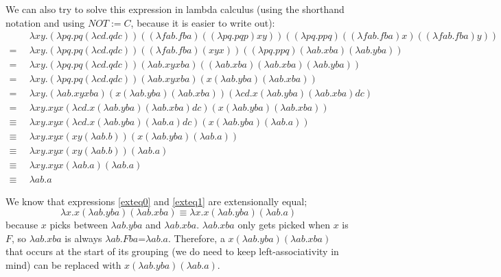 \documentclass[11pt]{article}
\begin{document}
We can also try to solve this expression in lambda calculus (using the
shorthand notation and using \(NOT:=C\), because it is easier to write out):
\small
\begin{align}
	&\enspace\lambda xy.
		(\lambda pq.pq(\lambda cd.qdc))
		((\lambda fab.fba)((\lambda pq.pqp)xy))
		((\lambda pq.ppq)((\lambda fab.fba)x)((\lambda fab.fba)y))\\
	=&\enspace\lambda xy.
		(\lambda pq.pq(\lambda cd.qdc))
		((\lambda fab.fba)(xyx))
		((\lambda pq.ppq)(\lambda ab.xba)(\lambda ab.yba))\\
	=&\enspace\lambda xy.
		(\lambda pq.pq(\lambda cd.qdc))
		(\lambda ab.xyxba)
		((\lambda ab.xba)(\lambda ab.xba)(\lambda ab.yba))\\
	=&\enspace\lambda xy.
		(\lambda pq.pq(\lambda cd.qdc))
		(\lambda ab.xyxba)
		(x(\lambda ab.yba)(\lambda ab.xba))\\
	=&\enspace\lambda xy.
		(\lambda ab.xyxba)
		(x(\lambda ab.yba)(\lambda ab.xba))
		(\lambda cd.x(\lambda ab.yba)(\lambda ab.xba)dc)\\
	=&\enspace\lambda xy.\label{exteq0}
		xyx
		(\lambda cd.x(\lambda ab.yba)(\lambda ab.xba)dc)
		(x(\lambda ab.yba)(\lambda ab.xba))\\
	\equiv&\enspace\lambda xy.\label{exteq1}
		xyx
		(\lambda cd.x(\lambda ab.yba)(\lambda ab.a)dc)
		(x(\lambda ab.yba)(\lambda ab.a))\\
	\equiv&\enspace\lambda xy.\label{exteq2}
		xyx
		(xy(\lambda ab.b))
		(x(\lambda ab.yba)(\lambda ab.a))\\
	\equiv&\enspace\lambda xy.\label{exteq3}
		xyx
		(xy(\lambda ab.b))
		(\lambda ab.a)\\
	\equiv&\enspace\lambda xy.\label{exteq4}
		xyx
		(\lambda ab.a)
		(\lambda ab.a)\\
	\equiv&\enspace\lambda ab.a\label{exteq5}
\end{align}
\normalsize

We know that expressions \ref{exteq0} and \ref{exteq1} are extensionally equal;
\[
	\lambda x.x(\lambda ab.yba)(\lambda ab.xba)\equiv
	\lambda x.x(\lambda ab.yba)(\lambda ab.a)
\]
because \(x\) picks between \(\lambda ab.yba\) and \(\lambda ab.xba\).
\(\lambda ab.xba\) only gets picked when \(x\) is \(F\), so \(\lambda ab.xba\)
is always \(\lambda ab.Fba\)=\(\lambda ab.a\). Therefore, a \(x(\lambda
ab.yba)(\lambda ab.xba)\) that occurs at the start of its grouping (we do need
to keep left-associativity in mind) can be replaced with \(x(\lambda
ab.yba)(\lambda ab.a)\).
\end{document}
